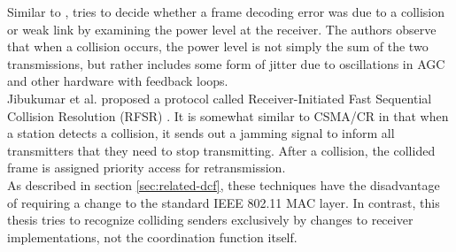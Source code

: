 Similar to \cite{zhu2015}, \cite{chua2016} tries to decide whether a frame decoding error was due to a collision or weak link by examining the power level at the receiver. The authors observe that when a collision occurs, the power level is not simply the sum of the two transmissions, but rather includes some form of jitter due to oscillations in \gls{AGC} and other hardware with feedback loops.\\

Jibukumar et al. proposed a protocol called Receiver-Initiated Fast Sequential Collision Resolution (RFSR) \cite{jibukumar2015}. It is somewhat similar to CSMA/CR \cite{choi2013} in that when a station detects a collision, it sends out a jamming signal to inform all transmitters that they need to stop transmitting. After a collision, the collided frame is assigned priority access for retransmission.\\

As described in section \ref{sec:related-dcf}, these techniques have the disadvantage of requiring a change to the standard IEEE 802.11 \gls{MAC} layer. In contrast, this thesis tries to recognize colliding senders exclusively by changes to receiver implementations, not the coordination function itself.
